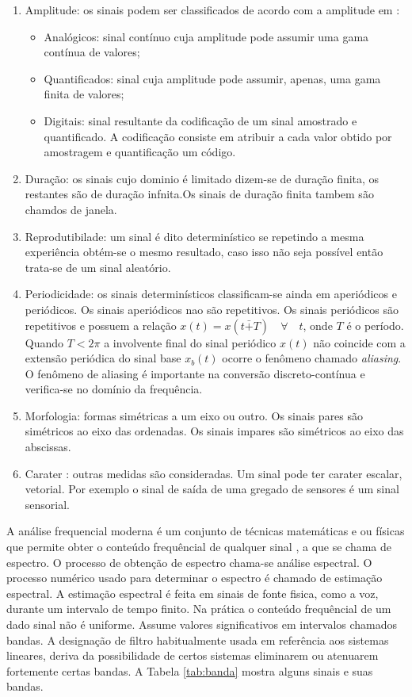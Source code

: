 \begin{enumerate}
\item Amplitude: os sinais podem ser classificados de acordo com a amplitude em :
\begin{itemize}
\item Analógicos: sinal contínuo cuja amplitude pode assumir uma gama contínua de valores;
\item Quantificados: sinal cuja amplitude pode assumir, apenas, uma gama finita de valores;
\item Digitais: sinal resultante da codificação de um sinal amostrado e quantificado. A codificação consiste em atribuir a cada valor obtido por amostragem e quantificação  um código.
\end{itemize} 
\item Duração: os sinais cujo dominio é limitado dizem-se de duração finita, os restantes são de duração infnita.Os sinais de duração finita tambem são chamdos de janela.
\item Reprodutibilade: um sinal é dito determinístico se repetindo a mesma experiência obtém-se o mesmo resultado, caso isso não seja possível  então trata-se de um sinal aleatório.
\item Periodicidade: os sinais determinísticos classificam-se ainda em aperiódicos e periódicos. Os sinais aperiódicos nao são repetitivos. Os sinais periódicos são repetitivos e possuem a relação $x(t) = x(t \bar{+} T) \quad \forall \quad t$, onde $T$ é o período. Quando $T < 2 \pi$ a involvente final do sinal periódico $x(t)$ não coincide com a extensão periódica do sinal base $x_b(t)$ ocorre o fenômeno chamado \textit{aliasing}. O fenômeno de aliasing é importante na conversão discreto-contínua e verifica-se no domínio da frequência.
\item Morfologia: formas simétricas a um eixo ou outro. Os sinais pares são simétricos ao eixo das ordenadas. Os sinais impares são simétricos ao eixo das abscissas.
\item Carater : outras medidas são consideradas. Um sinal pode ter carater escalar, vetorial. Por exemplo o sinal de saída de uma gregado de sensores é um sinal sensorial.
\end{enumerate}

A análise frequencial moderna é um conjunto de técnicas matemáticas e ou físicas que permite  obter o conteúdo frequêncial de qualquer sinal , a que se chama de espectro. O processo de obtenção de espectro chama-se análise espectral. O processo numérico usado para determinar o espectro é chamado de estimação espectral. A estimação espectral é feita em sinais de fonte fisica, como a voz, durante um intervalo de tempo finito. Na prática o conteúdo frequêncial de um dado sinal não é uniforme. Assume valores significativos em intervalos chamados bandas. A designação de filtro habitualmente usada em referência aos sistemas lineares, deriva da possibilidade de certos sistemas eliminarem ou atenuarem fortemente certas bandas. A Tabela \ref{tab:banda}
mostra alguns sinais e suas bandas.

